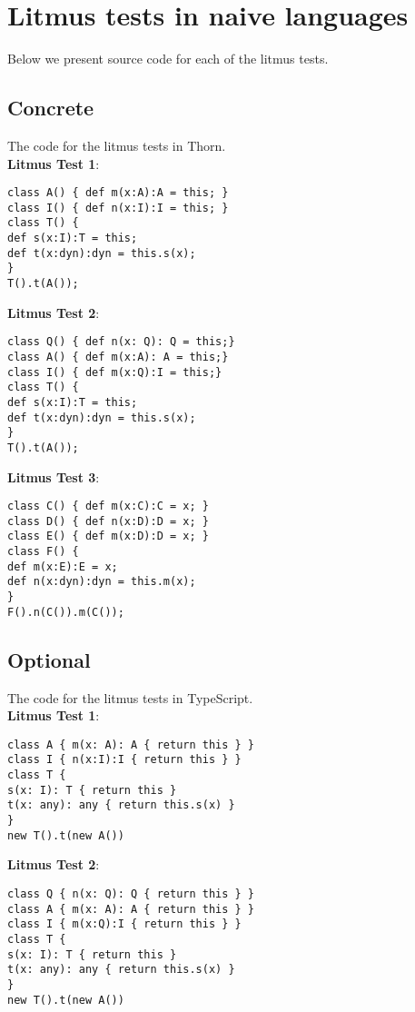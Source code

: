 \documentclass[]{article}
\begin{document}
\section{Litmus tests in naive languages}

Below we present source code for each of the litmus tests.

\subsection*{Concrete}

The code for the litmus tests in Thorn. \\ 

\noindent
\textbf{Litmus Test 1}:
\begin{verbatim}
class A() { def m(x:A):A = this; }
class I() { def n(x:I):I = this; }
class T() {
def s(x:I):T = this;
def t(x:dyn):dyn = this.s(x);
}
T().t(A());
\end{verbatim}

\noindent
\textbf{Litmus Test 2}:
\begin{verbatim}
class Q() { def n(x: Q): Q = this;}
class A() { def m(x:A): A = this;}
class I() { def m(x:Q):I = this;}
class T() {
def s(x:I):T = this; 
def t(x:dyn):dyn = this.s(x);
}
T().t(A());   
\end{verbatim}


\noindent\textbf{Litmus Test 3}:
\begin{verbatim}
class C() { def m(x:C):C = x; }
class D() { def n(x:D):D = x; }
class E() { def m(x:D):D = x; }      
class F() {
def m(x:E):E = x;
def n(x:dyn):dyn = this.m(x);
} 
F().n(C()).m(C());
\end{verbatim}

\subsection*{Optional}

The code for the litmus tests in TypeScript. \\

\noindent\textbf{Litmus Test 1}:
\begin{verbatim}
class A { m(x: A): A { return this } }
class I { n(x:I):I { return this } }
class T {
s(x: I): T { return this }
t(x: any): any { return this.s(x) }
}
new T().t(new A())
\end{verbatim}

\noindent\textbf{Litmus Test 2}:
\begin{verbatim}
class Q { n(x: Q): Q { return this } }
class A { m(x: A): A { return this } }
class I { m(x:Q):I { return this } }
class T {
s(x: I): T { return this }
t(x: any): any { return this.s(x) }
}
new T().t(new A())
\end{verbatim}
\end{document}
